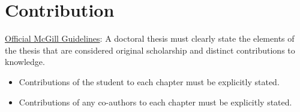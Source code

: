 \chapter*{\rm\bfseries Contribution}
\label{ch:contribution}

\href{https://www.mcgill.ca/gps/thesis/thesis-guidelines/preparation}{Official McGill Guidelines}: A doctoral thesis must clearly state the elements of the thesis that are considered original scholarship and distinct contributions to knowledge.

\begin{itemize}
    \item{Contributions of the student to each chapter must be explicitly stated.}
    \item{Contributions of any co-authors to each chapter must be explicitly stated.}
\end{itemize}


 